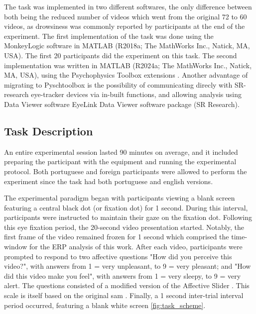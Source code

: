 The task was implemented in two different softwares, the only difference between both being the reduced number of videos which went from the original 72 to 60 videos, as drowsiness was commonly reported by participants at the end of the experiment. The first implementation of the task was done using the MonkeyLogic software \cite{asaadFlexibleSoftwareTool2008} in MATLAB (R2018a; The MathWorks Inc., Natick, MA, USA). The first 20 participants did the experiment on this task. The second implementation was written in MATLAB (R2024a; The MathWorks Inc., Natick, MA, USA), using the Psychophysics Toolbox extensions \cite{pelliVideoToolboxSoftwareVisual1997, brainardPsychophysicsToolbox1997, cecbb7f7e1544489b920fd276dc6eb0c}. Another advantage of migrating to Pyschtoolbox is the possibility of communicating direcly with SR-research eye-tracker devices via in-built functions, and allowing analysis using Data Viewer software EyeLink Data Viewer software package (SR Research).

\subsection{Task Description}
An entire experimental session lasted 90 minutes on average, and it included preparing the participant with the equipment and running the experimental protocol. Both portuguese and foreign participants were allowed to perform the experiment since the task had both portuguese and english versions.
 
The experimental paradigm began with participants viewing a blank screen featuring a central black dot (or fixation dot) for 1 second. During this interval, participants were instructed to maintain their gaze on the fixation dot. Following this eye fixation period, the 20-second video presentation started. Notably, the first frame of
the video remained frozen for 1 second which comprised the time-window for the ERP analysis of this work. After each video, participants were prompted to respond to two affective questions  "How did you perceive this video?", with answers from 1 = very unpleasant, to 9 = very pleasant; and "How did this video make you feel", with answers from 1 = very sleepy, to 9 = very alert. The questions consisted of a modified version of the Affective Slider \cite{betellaAffectiveSliderDigital2016}. This scale is itself based on the original \acrfull{sam} \cite{bradleyMeasuringEmotionSelfassessment1994a}. Finally, a 1 second inter-trial interval period occurred, featuring a blank white screen \ref{fig:task_scheme}.

